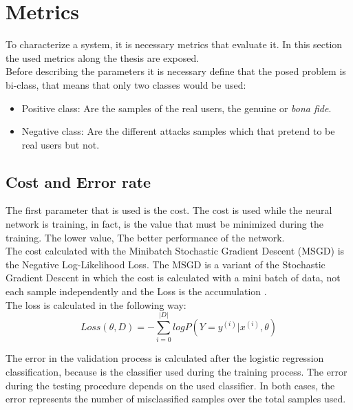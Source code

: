 \section{Metrics}
To characterize a system, it is necessary metrics that evaluate it. In this section the used metrics along the thesis are exposed.\\

Before describing the parameters it is necessary define that the posed problem is bi-class, that means that only two classes would be used:

\begin{itemize}
\item Positive class: Are the samples of the real users, the genuine or \textit{bona fide}.
\item Negative class: Are the different attacks samples which that pretend to be real users but not.
\end{itemize}

\subsection{Cost and Error rate}
The first parameter that is used is the cost. The cost is used while the neural network is training, in fact, is the value that must be minimized during the training. The lower value, The better performance of the network.\\

The cost calculated with the Minibatch Stochastic Gradient Descent (MSGD) is the Negative Log-Likelihood Loss. The MSGD is a variant of the Stochastic Gradient Descent in which the cost is calculated with a mini batch of data, not each sample independently and the Loss is the accumulation \cite{Stutz}.\\

The loss is calculated in the following way:\\

\begin{equation}
  Loss(\theta, D) = - \sum_{i=0}^{|D|}log P(Y = y^{(i)}|x^{(i)}, \theta)
\end{equation}

The error in the validation process is calculated after the logistic regression classification, because is the classifier used during the training process. The error during the testing procedure depends on the used classifier. In both cases, the error represents the number of misclassified samples over the total samples used.\\ 


